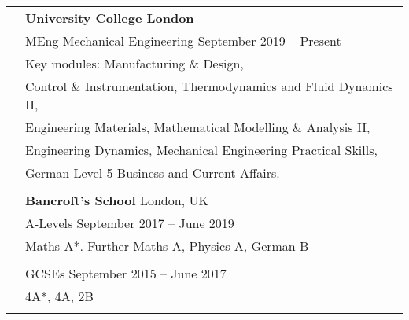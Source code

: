 \documentclass[letterpaper, 11pt]{article}
\begin{document}
\begin{longtable}{p{1.3in}p{4.8in}}




\color{OliveGreen}{Education} 
& \textbf{University College London} \\ 
& MEng Mechanical Engineering \hfill September 2019 -- Present \\
& Key modules: Manufacturing \& Design, \\
& Control \& Instrumentation, Thermodynamics and Fluid Dynamics II, \\
& Engineering Materials, Mathematical Modelling \& Analysis II, \\
& Engineering Dynamics, Mechanical Engineering Practical Skills,\\ 
& German Level 5 Business and Current Affairs.\\
& \\

& \textbf{Bancroft's School} \hfill London, UK \\
& A-Levels \hfill September 2017 -- June 2019\\
& Maths A*. Further Maths A, Physics A, German B\\
& \\
& GCSEs \hfill September 2015 -- June 2017 \\
& 4A*, 4A, 2B\\
& \\




\end{longtable}
\end{document}
